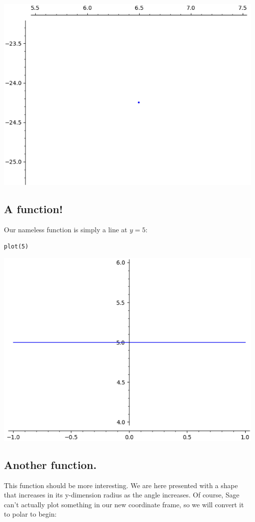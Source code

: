 \documentclass[letterpaper]{article}
\begin{document}
\begin{center}
\includegraphics[width=.9\linewidth]{2022-06-01_09-51-33_screenshot.png}
\end{center}

\subsection{A function!}
\label{sec:org8d0b374}
Our nameless function is simply a line at \(y=5\):

\begin{verbatim}
plot(5)
\end{verbatim}

\begin{center}
\includegraphics[width=.9\linewidth]{2022-06-01_09-57-14_screenshot.png}
\end{center}

\subsection{Another function.}
\label{sec:orga6492ae}
This function should be more interesting. We are here presented with a shape that increases in its y-dimension radius as the angle increases. Of course, Sage can't actually plot something in our new coordinate frame, so we will convert it to polar to begin:
\end{document}

